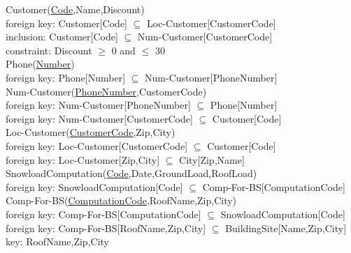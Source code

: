 {{\color{ForestGreen}Customer(\underline{Code},Name,Discount)}\\
{\color{Orange}\hspace{2mm} foreign key: {\color{Magenta}Customer[Code] $\subseteq$ Loc-Customer[CustomerCode]}} \\
{\color{Orange}\hspace{2mm} inclusion: {\color{Magenta}Customer[Code] $\subseteq$ Num-Customer[CustomerCode]} \\
{\color{Orange}\hspace{2mm} constraint: {\color{Magenta}Discount $\geqslant$  0 and $\leqslant$ 30}} \\

{\color{ForestGreen}Phone(\underline{Number})}\\
{\color{Orange}\hspace{2mm} foreign key: {\color{Magenta}Phone[Number] $\subseteq$ Num-Customer[PhoneNumber]}} \\

{\color{ForestGreen}Num-Customer(\underline{PhoneNumber},CustomerCode)}}\\
{\color{Orange}\hspace{2mm} foreign key: {\color{Magenta}Num-Customer[PhoneNumber] $\subseteq$ Phone[Number]}} \\
{\color{Orange}\hspace{2mm} foreign key: {\color{Magenta}Num-Customer[CustomerCode] $\subseteq$ Customer[Code]}} \\

{\color{ForestGreen}Loc-Customer(\underline{CustomerCode},Zip,City)}\\
{\color{Orange}\hspace{2mm} foreign key: {\color{Magenta}Loc-Customer[CustomerCode] $\subseteq$ Customer[Code]}} \\
{\color{Orange}\hspace{2mm} foreign key: {\color{Magenta}Loc-Customer[Zip,City] $\subseteq$ City[Zip,Name]}} \\

{\color{ForestGreen}SnowloadComputation(\underline{Code},Date,GroundLoad,RoofLoad)}\\
{\color{Orange}\hspace{2mm} foreign key: {\color{Magenta}SnowloadComputation[Code] $\subseteq$ Comp-For-BS[ComputationCode]}} \\

{\color{ForestGreen}Comp-For-BS(\underline{ComputationCode},RoofName,Zip,City)}\\
{\color{Orange}\hspace{2mm} foreign key: {\color{Magenta}Comp-For-BS[ComputationCode] $\subseteq$ SnowloadComputation[Code]}} \\
{\color{Orange}\hspace{2mm} foreign key: {\color{Magenta}Comp-For-BS[RoofName,Zip,City] $\subseteq$ BuildingSite[Name,Zip,City]}} \\
{\color{Orange}\hspace{2mm} key: {\color{Magenta}RoofName,Zip,City}} \\

}
